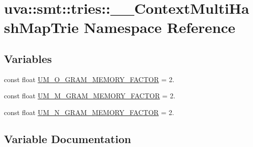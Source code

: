 \hypertarget{namespaceuva_1_1smt_1_1tries_1_1_____context_multi_hash_map_trie}{}\section{uva\+:\+:smt\+:\+:tries\+:\+:\+\_\+\+\_\+\+Context\+Multi\+Hash\+Map\+Trie Namespace Reference}
\label{namespaceuva_1_1smt_1_1tries_1_1_____context_multi_hash_map_trie}
\subsection*{Variables}
\begin{DoxyCompactItemize}
\item 
const float \hyperlink{namespaceuva_1_1smt_1_1tries_1_1_____context_multi_hash_map_trie_ab5f843814455e8c03ba0ca80b78fef77}{U\+M\+\_\+\+O\+\_\+\+G\+R\+A\+M\+\_\+\+M\+E\+M\+O\+R\+Y\+\_\+\+F\+A\+C\+T\+O\+R} = 2.
\item 
const float \hyperlink{namespaceuva_1_1smt_1_1tries_1_1_____context_multi_hash_map_trie_a997e5084e13e3c54bbc0c9d092ba1172}{U\+M\+\_\+\+M\+\_\+\+G\+R\+A\+M\+\_\+\+M\+E\+M\+O\+R\+Y\+\_\+\+F\+A\+C\+T\+O\+R} = 2.
\item 
const float \hyperlink{namespaceuva_1_1smt_1_1tries_1_1_____context_multi_hash_map_trie_a7f79947a139d98629cbcd14d39b495d6}{U\+M\+\_\+\+N\+\_\+\+G\+R\+A\+M\+\_\+\+M\+E\+M\+O\+R\+Y\+\_\+\+F\+A\+C\+T\+O\+R} = 2.
\end{DoxyCompactItemize}


\subsection{Variable Documentation}
\hypertarget{namespaceuva_1_1smt_1_1tries_1_1_____context_multi_hash_map_trie_a997e5084e13e3c54bbc0c9d092ba1172}{}

